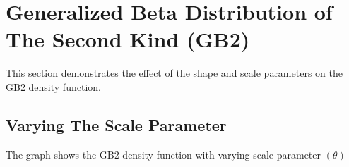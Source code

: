\documentclass[]{book}
\theoremstyle{definition}
\theoremstyle{definition}
\theoremstyle{definition}
\theoremstyle{remark}
\begin{document}
\section{Generalized Beta Distribution of The Second Kind
(GB2)}\label{generalized-beta-distribution-of-the-second-kind-gb2}

This section demonstrates the effect of the shape and scale parameters
on the GB2 density function.

\subsection{Varying The Scale
Parameter}\label{varying-the-scale-parameter-3}

The graph shows the GB2 density function with varying scale parameter
\((\theta)\)
\end{document}
